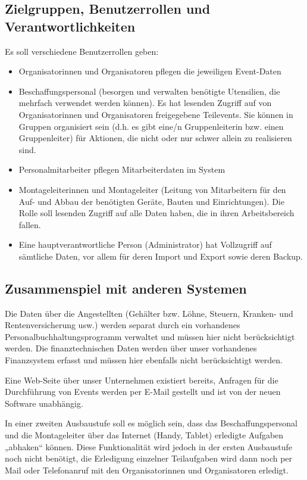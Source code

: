 \subsection{Zielgruppen, Benutzerrollen und Verantwortlichkeiten}
Es soll verschiedene Benutzerrollen geben:
\begin{itemize}
    \item Organisatorinnen und Organisatoren pflegen die jeweiligen Event-Daten
    \item Beschaffungspersonal (besorgen und verwalten benötigte Utensilien, die mehrfach verwendet werden können). Es hat lesenden Zugriff auf von Organisatorinnen und Organisatoren freigegebene Teilevents. Sie können in Gruppen organisiert sein (d.h. es gibt eine/n Gruppenleiterin bzw. einen Gruppenleiter) für Aktionen, die nicht oder nur schwer allein zu realisieren sind. 
    \item Personalmitarbeiter pflegen Mitarbeiterdaten im System 
    \item Montageleiterinnen und Montageleiter (Leitung von Mitarbeitern für den Auf- und Abbau der benötigten Geräte, Bauten und Einrichtungen). Die Rolle soll lesenden Zugriff auf alle Daten haben, die in ihren Arbeitsbereich fallen.
    \item Eine hauptverantwortliche Person (Administrator) hat Vollzugriff auf sämtliche Daten, vor allem für deren Import und Export sowie deren Backup. 
\end{itemize}
\subsection{Zusammenspiel mit anderen Systemen}
Die Daten über die Angestellten (Gehälter bzw. Löhne, Steuern, Kranken- und Rentenversicherung usw.) werden separat durch ein vorhandenes Personalbuchhaltungsprogramm verwaltet und müssen hier nicht berücksichtigt werden. Die finanztechnischen Daten werden über unser vorhandenes Finanzsystem erfasst und müssen hier ebenfalls nicht berücksichtigt werden.

Eine Web-Seite über unser Unternehmen existiert bereits, Anfragen für die Durchführung von Events werden per E-Mail gestellt und ist von der neuen Software unabhängig.

In einer zweiten Ausbaustufe soll es möglich sein, dass das Beschaffungspersonal und die Montageleiter über das Internet (Handy, Tablet) erledigte Aufgaben „abhaken“ können. Diese Funktionalität wird jedoch in der ersten Ausbaustufe noch nicht benötigt, die Erledigung einzelner Teilaufgaben wird dann noch per Mail oder Telefonanruf mit den Organisatorinnen und Organisatoren erledigt.

